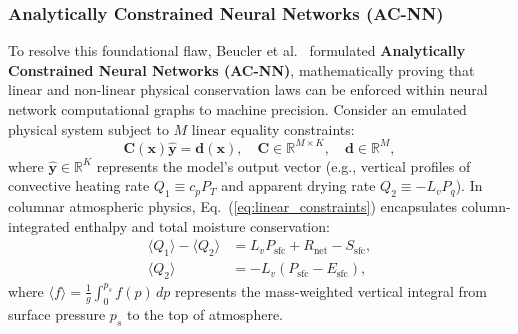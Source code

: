 \subsubsection{Analytically Constrained Neural Networks (AC-NN)}
To resolve this foundational flaw, Beucler et al.~\cite{beucler2021enforcing} formulated \textbf{Analytically Constrained Neural Networks (AC-NN)}, mathematically proving that linear and non-linear physical conservation laws can be enforced within neural network computational graphs to machine precision. Consider an emulated physical system subject to $M$ linear equality constraints:
\begin{equation}
    \mathbf{C}(\mathbf{x}) \hat{\mathbf{y}} = \mathbf{d}(\mathbf{x}), \quad \mathbf{C} \in \mathbb{R}^{M \times K}, \quad \mathbf{d} \in \mathbb{R}^M,
    \label{eq:linear_constraints}
\end{equation}
where $\hat{\mathbf{y}} \in \mathbb{R}^K$ represents the model's output vector (e.g., vertical profiles of convective heating rate $Q_1 \equiv c_p P_T$ and apparent drying rate $Q_2 \equiv -L_v P_q$). In columnar atmospheric physics, Eq.~(\ref{eq:linear_constraints}) encapsulates column-integrated enthalpy and total moisture conservation:
\begin{align}
    \langle Q_1 \rangle - \langle Q_2 \rangle &= L_v P_{\text{sfc}} + R_{\text{net}} - S_{\text{sfc}}, \label{eq:column_enthalpy} \\
    \langle Q_2 \rangle &= -L_v (P_{\text{sfc}} - E_{\text{sfc}}), \label{eq:column_water}
\end{align}
where $\langle f \rangle = \frac{1}{g} \int_0^{p_s} f(p) \, dp$ represents the mass-weighted vertical integral from surface pressure $p_s$ to the top of atmosphere. 

